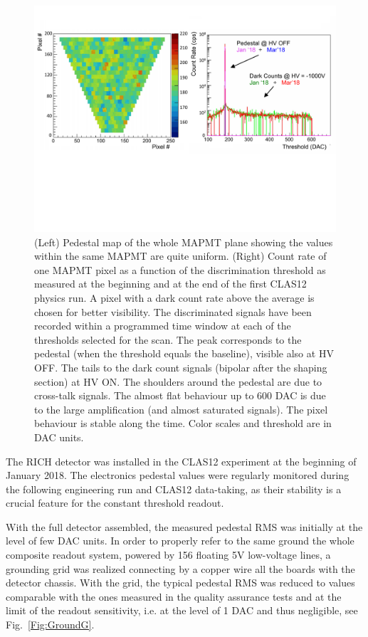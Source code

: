 \documentclass[final,5p,times,twocolumn]{elsarticle}
\begin{document}
\begin{figure}[t]
\begin{center}
\includegraphics[width=1.0\columnwidth]{EPS/Figure5.pdf}
\end{center}
\caption{
(Left) Pedestal map of the whole MAPMT plane showing the
values within the same MAPMT are quite uniform. (Right) Count rate of one MAPMT pixel as a function of the
discrimination threshold as measured at the beginning and at the end of the first CLAS12 physics run.
A pixel with a dark count rate above the average is chosen for better visibility.
The discriminated signals have been recorded within a programmed time window at each of the thresholds selected for the scan.
The peak corresponds to the pedestal (when the threshold equals the baseline), visible also at HV OFF. The tails to the
dark count signals (bipolar after the shaping section) at HV ON. The shoulders around the pedestal are due to cross-talk
signals. The almost flat behaviour up to 600 DAC is due to the large amplification (and almost saturated
signals). The pixel behaviour is stable along the time. Color scales and threshold are in DAC units.}
\label{Fig:PedTime}
\end{figure}

The RICH detector was installed in the CLAS12 experiment at the beginning of January 2018. The electronics pedestal values 
were regularly monitored during the following engineering run and CLAS12 data-taking, as their stability is a crucial 
feature for the constant threshold readout. 

With the full detector assembled, the measured pedestal RMS was initially at the level of few DAC units.
In order to properly refer to the same ground the whole composite readout system, powered by 156 floating 5V low-voltage lines,
a grounding grid was realized connecting by a copper wire all the boards with the detector chassis. With the grid,
the typical pedestal RMS was reduced to
values comparable with the ones measured in the quality assurance tests and at the limit of the readout sensitivity,
i.e. at the level of 1 DAC and thus negligible, see Fig.~\ref{Fig:GroundG}.
\end{document}
